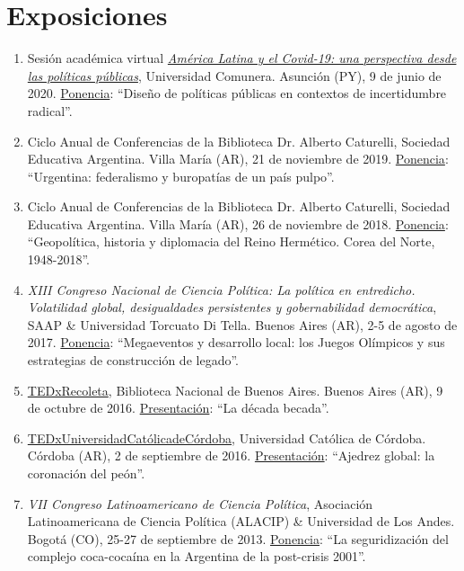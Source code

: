\documentclass[12pt]{article}
\begin{document}
\section*{Exposiciones}

\begin{enumerate}

\item Sesión académica virtual \href{https://www.facebook.com/watch/live/?v=2955083387939317}{\it América Latina y el Covid-19: una perspectiva desde las políticas públicas}, Universidad Comunera. Asunción (PY), 9 de junio de 2020. \underline {Ponencia}: “Diseño de políticas públicas en contextos de incertidumbre radical”.

\item Ciclo Anual de Conferencias de la Biblioteca Dr. Alberto Caturelli, Sociedad Educativa Argentina. Villa María (AR), 21 de noviembre de 2019. \underline {Ponencia}: “Urgentina: federalismo y buropatías de un país pulpo”.

\item Ciclo Anual de Conferencias de la Biblioteca Dr. Alberto Caturelli, Sociedad Educativa Argentina. Villa María (AR), 26 de noviembre de 2018. \underline {Ponencia}: “Geopolítica, historia y diplomacia del Reino Hermético. Corea del Norte, 1948-2018”.

\item {\it XIII Congreso Nacional de Ciencia Política: La política en entredicho. Volatilidad global, desigualdades persistentes y gobernabilidad democrática}, SAAP \& Universidad Torcuato Di Tella. Buenos Aires (AR), 2-5 de agosto de 2017. \underline {Ponencia}: “Megaeventos y desarrollo local: los Juegos Olímpicos y sus estrategias de construcción de legado”. 

\item \href{https://www.youtube.com/watch?v=DnXO4vuB9bU}{TEDxRecoleta}, Biblioteca Nacional de Buenos Aires. Buenos Aires (AR), 9 de octubre de 2016. \underline {Presentación}: “La década becada”.

\item \href{https://www.youtube.com/watch?v=aUp86rzTjew}{TEDxUniversidadCatólicadeCórdoba}, Universidad Católica de Córdoba. Córdoba (AR), 2 de septiembre de 2016. \underline {Presentación}: “Ajedrez global: la coronación del peón”.

\item {\it VII Congreso Latinoamericano de Ciencia Política}, Asociación Latinoamericana de Ciencia Política (ALACIP) \& Universidad de Los Andes. Bogotá (CO), 25-27 de septiembre de 2013. \underline {Ponencia}: “La seguridización del complejo coca-cocaína en la Argentina de la post-crisis 2001”.


\end{enumerate}
\end{document}
